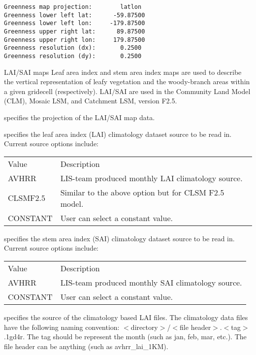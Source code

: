  \begin{Verbatim}[frame=single]
Greenness map projection:        latlon
Greenness lower left lat:      -59.87500
Greenness lower left lon:     -179.87500
Greenness upper right lat:      89.87500
Greenness upper right lon:     179.87500
Greenness resolution (dx):       0.2500
Greenness resolution (dy):       0.2500
 \end{Verbatim}

 
 LAI/SAI maps
 Leaf area index and stem area index maps are used to describe the 
 vertical representation of leafy vegetation and the woody-branch
 areas within a given gridecell (respectively).  
 LAI/SAI are used in the Community Land Model (CLM), Mosaic LSM, and
 Catchment LSM, version F2.5.


  specifies the projection of the
 LAI/SAI map data.

  specifies the leaf area index (LAI)
 climatology dataset source to be read in. Current source options include:

 \begin{tabular}{ll}
 Value      & Description    \\
 AVHRR       &  LIS-team produced monthly LAI climatology source. \\
 CLSMF2.5    &  Similar to the above option but for CLSM F2.5 model. \\
 CONSTANT    &  User can select a constant value. \\
 \end{tabular}

  specifies the stem area index (SAI)
 climatology dataset source to be read in. Current source options include:

 \begin{tabular}{ll}
 Value      & Description    \\
 AVHRR       &  LIS-team produced monthly SAI climatology source. \\
 CONSTANT    &   User can select a constant value. \\
 \end{tabular}

  specifies the source of the climatology based
 LAI files. The climatology data files have the following
 naming convention: $<$directory$>$/$<$file header$>$.$<$tag$>$.1gd4r.
 The tag should be represent the month (such as jan, feb, mar, etc.).
 The file header can be anything (such as avhrr\_lai\_1KM).

